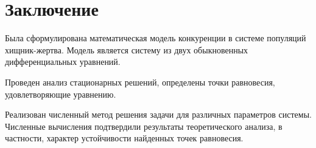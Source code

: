 \chapter{Заключение}
Была сформулирована математическая модель конкуренции в системе популяций хищник-жертва.
Модель является систему из двух обыкновенных дифференциальных уравнений.

Проведен анализ стационарных решений, определены точки равновесия, удовлетворяющие уравнению.

Реализован численный метод решения задачи для различных параметров системы. Численные вычисления подтвердили результаты теоретического анализа, в частности, характер устойчивости найденных точек равновесия.